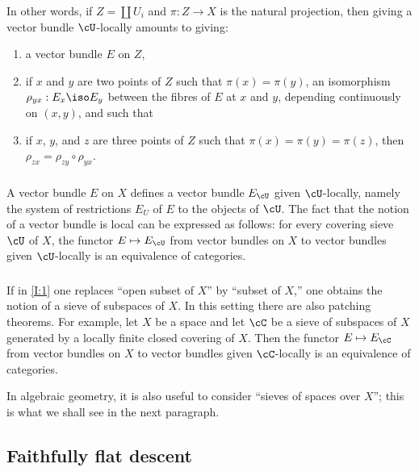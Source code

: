 \documentclass[oneside]{book}
\begin{document}
In other words, if $Z=\coprod U_i$ and $\pi:Z\to X$ is the natural
projection, then giving a vector bundle $\cU$-locally amounts to giving:
\begin{enumerate}[\indent a)]
  \item a vector bundle $E$ on $Z$,
  \item if $x$ and $y$ are two points of $Z$ such that
    $\pi(x)=\pi(y)$, an isomorphism $\rho_{yx}:E_x\iso E_y$ between the
    fibres of $E$ at $x$ and $y$, depending continuously on $(x,y)$,
    and such that
  \item if $x$, $y$, and $z$ are three points of $Z$ such that
    $\pi(x)=\pi(y)=\pi(z)$, then
    $\rho_{zx}=\rho_{zy}\circ\rho_{yx}$.
\end{enumerate}

\subsubsection{}\label{I:1-3-3}

A vector bundle $E$ on $X$ defines a vector bundle $E_\cU$ given
$\cU$-locally, namely the system of restrictions $E_U$ of $E$ to the
objects of $\cU$. The fact that the notion of a vector bundle is local can
be expressed as follows: for every covering sieve $\cU$ of $X$, the
functor $E\mapsto E_\cU$ from vector bundles on $X$ to vector bundles
given $\cU$-locally is an equivalence of categories.

\subsubsection{}\label{I:1-3-4}

If in \ref{I:1} one replaces “open subset of $X$” by “subset of $X$,”
one obtains the notion of a sieve of subspaces of $X$. In this setting
there are also patching theorems. For example, let $X$ be a space and
let $\cC$ be a sieve of subspaces of $X$ generated by a locally finite
closed covering of $X$. Then the functor $E\mapsto E_\cC$ from vector
bundles on $X$ to vector bundles given $\cC$-locally is an equivalence
of categories.

In algebraic geometry, it is also useful to consider “sieves of spaces
over $X$”; this is what we shall see in the next paragraph.

\subsection{Faithfully flat descent}\label{I:1-4}
\end{document}
